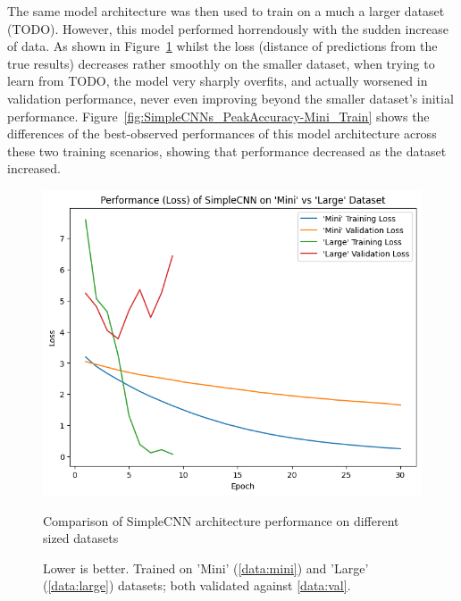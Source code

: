                 The same model architecture was then used to train on a much a larger dataset (TODO). However, this model performed horrendously with the sudden increase of data. As shown in Figure~\ref{fig:SimpleCNNs_TrainLoss-Mini_Train} whilst the loss (distance of predictions from the true results) decreases rather smoothly on the smaller dataset, when trying to learn from TODO, the model very sharply overfits, and actually worsened in validation performance, never even improving beyond the smaller dataset's initial performance. Figure~\ref{fig:SimpleCNNs_PeakAccuracy-Mini_Train} shows the differences of the best-observed performances of this model architecture across these two training scenarios, showing that performance decreased as the dataset increased.
        
                \begin{figure}[h]
                    \centering
                    \includegraphics[width=\textwidth]{images/SimpleCNNs_TrainLoss.png}
                    \caption{Comparison of SimpleCNN architecture performance on different sized datasets}
                    \label{fig:SimpleCNNs_TrainLoss-Mini_Train}
                    \caption*{Lower is better. Trained on 'Mini' (\ref{data:mini}) and 'Large' (\ref{data:large}) datasets; both validated against \ref{data:val}.}
                \end{figure}
        
